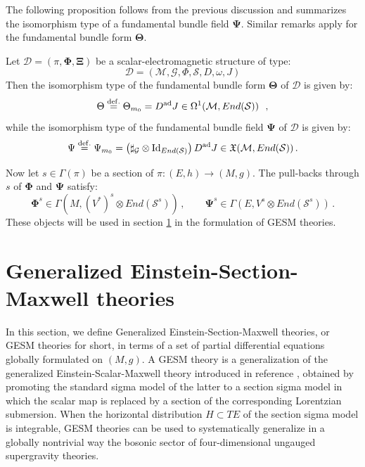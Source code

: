\documentclass[10pt, cmp, numbook, final, a4paper]{svjour}
\def\ad{\mathrm{ad}}
\newcommand{\eqdef}{\stackrel{{\rm def.}}{=}}
\def\ad{\mathrm{ad}}
\def\bcD{\boldsymbol{\mathcal{D}}}
\def\bTheta{\mathbf{\Theta}}
\def\bPsi{\mathbf{\Psi}}
\newcommand{\cM}{\mathcal{M}}
\def\cD{\mathcal{D}}
\def\cG{\mathcal{G}}
\def\bXi{{\boldsymbol{\Xi}}}
\def\cS{\mathcal{S}}
\def\bPhi{\mathbf{\Phi}}
\def\bcS{\boldsymbol{\mathcal{S}}}
\begin{document}
\noindent
The following proposition follows from the previous discussion and
summarizes the isomorphism type of a fundamental bundle field
$\bPsi$. Similar remarks apply for the fundamental bundle form
$\bTheta$.
\begin{proposition}
Let $\bcD = (\pi,\bPhi,\bXi)$ be a scalar-electromagnetic structure of
type:
\begin{equation*}
\cD = (\cM, \cG, \Phi,\cS,D,\omega,J)
\end{equation*}
Then the isomorphism type of the fundamental bundle form $\bTheta$
of $\bcD$ is given by:
\begin{equation*}
\Theta \eqdef \Theta_{m_{0}} = D^{\ad}J \in \Omega^{1}(\cM,End(\cS))~~,
\end{equation*}
while the isomorphism type of the fundamental bundle field $\bPsi$
of $\bcD$ is given by:
\begin{equation*}
\Psi \eqdef \Psi_{m_{0}} = \left(\sharp_{\cG}\otimes \mathrm{Id}_{End(\cS)} \right) D^{\ad}J \in \mathfrak{X}(\cM,End(\cS)) \, .
\end{equation*}
\end{proposition}

\noindent
Now let $s\in \Gamma(\pi)$ be a section of $\pi\colon (E,h)\to
(M,g)$. The pull-backs through $s$ of $\bPhi$ and $\bPsi$ satisfy:
\begin{equation*}
\bPhi^{s}\in \Gamma(M,(V^{\ast})^{s}\otimes End(\bcS^{s}))\, , \qquad \bPsi^{s}\in \Gamma(E,V^{s}\otimes End(\bcS^{s}))\, .
\end{equation*}
These objects will be used in section \ref{sec:GESM} in the formulation of GESM theories.


\section{Generalized Einstein-Section-Maxwell theories}
\label{sec:GESM}

In this section, we define Generalized Einstein-Section-Maxwell
theories, or GESM theories for short, in terms of a set of partial
differential equations globally formulated on $(M,g)$. A GESM theory
is a generalization of the generalized Einstein-Scalar-Maxwell theory
introduced in reference \cite{GESM}, obtained by promoting the
standard sigma model of the latter to a section sigma model in which
the scalar map is replaced by a section of the corresponding
Lorentzian submersion. When the horizontal distribution $H\subset TE$
of the section sigma model is integrable, GESM theories can be used to
systematically generalize in a globally nontrivial way the bosonic
sector of four-dimensional ungauged supergravity theories.
\end{document}
